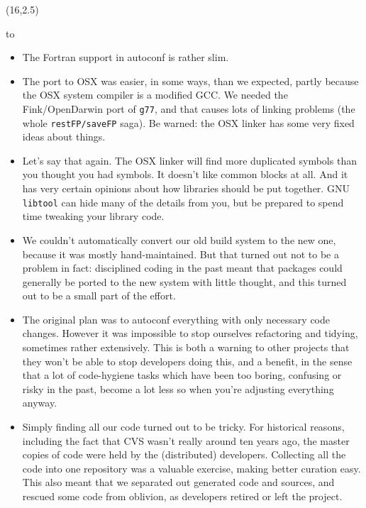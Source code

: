 \documentclass[a0,portrait]{a0poster-ng}
\def\RHead#1{\noindent\hbox to \hsize{\hfil{\LARGE\color{DarkBlue} #1\par}}\bigskip}
\let\Head\RHead
\def\RHead#1{\noindent\hbox to \hsize{\hfil{\huge\color{DarkBlue} #1\par}}\bigskip}
\let\Head\RHead
\newcommand{\autoconf}{{\ttfamily\small autoconf}}
\newcommand{\autoconf}{{\ttfamily\normalsize autoconf}}
\begin{document}
\begin{textblock}{7}(16,2.5)

\Head{Lessons and Warnings}

\begin{itemize}
\item The Fortran support in \autoconf{} is rather slim.

\item The port to OSX was easier, in some ways, than we expected,
  partly because the OSX system compiler is a modified GCC.  We needed
  the Fink/OpenDarwin port of \texttt{g77}, and that causes lots of
  linking problems (the whole \texttt{restFP/saveFP} saga).  Be
  warned: the OSX linker has some very fixed ideas about things.

\item Let's say that again.  The OSX linker will find more duplicated
  symbols than you thought you had symbols.  It doesn't like common
  blocks at all.  And it has very certain opinions about how libraries
  should be put together.  GNU \texttt{libtool} can hide many of the
  details from you, but be prepared to spend time tweaking your library code.

\item We couldn't automatically convert our old build system to the
  new one, because it was mostly hand-maintained.  But that turned out
  not to be a problem in fact: disciplined coding in the past meant
  that packages could
  generally be ported to the new system with little thought, and this
  turned out to be a small part of the effort.

\item The original plan was to autoconf everything with only necessary
  code changes.  However it was impossible to stop ourselves
  refactoring and tidying, sometimes rather extensively.  This is
  both a warning to other projects that they won't be able to stop
  developers doing this, and a benefit, in the sense that a lot of
  code-hygiene tasks which have been too boring, confusing or risky in
  the past, become a lot less so when you're adjusting everything
  anyway.

\item Simply finding all our code turned out to be tricky.  For
  historical reasons, including the fact that CVS wasn't really around
  ten years ago, the master copies of code were held by the
  (distributed) developers.  Collecting all the code into one
  repository was a valuable exercise, making better curation easy.
  This also meant that we separated out generated code and sources, and
  rescued some code from oblivion, as developers retired or left the
  project.


\end{itemize}
\end{textblock}
\end{document}
